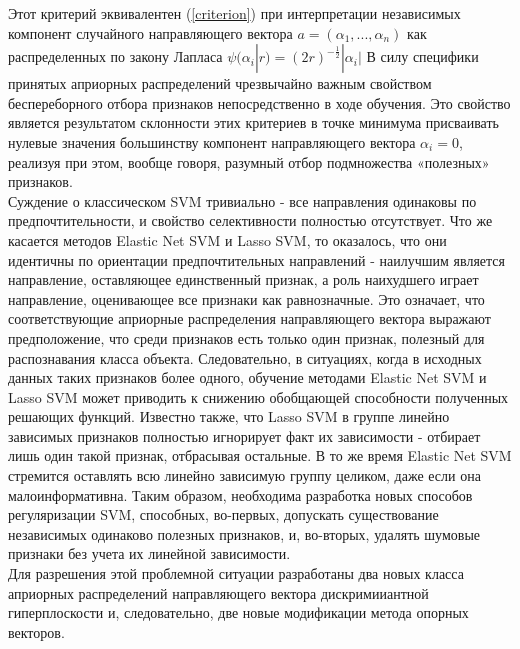 \documentclass[../body.tex]{subfiles}
\begin{document}
Этот критерий эквивалентен (\ref{criterion}) при интерпретации независимых компонент случайного
направляющего вектора $a=(\alpha_1, ..., \alpha_n)$ как распределенных по закону Лапласа $\psi(\alpha_i|r) = (2r)^{-\frac{1}{2}}|\alpha_i|$
В силу специфики принятых априорных распределений чрезвычайно важным свойством беспереборного отбора признаков непосредственно в ходе обучения. Это свойство является результатом
склонности этих критериев в точке минимума присваивать нулевые значения большинству
компонент направляющего вектора $\alpha_i = 0$, реализуя при этом, вообще говоря, разумный
отбор подмножества «полезных» признаков. 
\\

Суждение о классическом SVM тривиально - все направления одинаковы по предпочтительности, и свойство селективности полностью отсутствует. Что же касается методов
Elastic Net SVM и Lasso SVM, то оказалось, что они идентичны по ориентации предпочтительных направлений - наилучшим является направление, оставляющее единственный
признак, а роль наихудшего играет направление, оценивающее все признаки как равнозначные. Это означает, что соответствующие априорные распределения направляющего
вектора выражают предположение, что среди признаков есть только один признак, полезный для распознавания класса объекта. Следовательно, в ситуациях, когда в исходных
данных таких признаков более одного, обучение методами Elastic Net SVM и Lasso SVM
может приводить к снижению обобщающей способности полученных решающих функций.
Известно также, что Lasso SVM в группе линейно зависимых признаков полностью
игнорирует факт их зависимости - отбирает лишь один такой признак, отбрасывая остальные. В то же время Elastic Net SVM стремится оставлять всю линейно зависимую группу
целиком, даже если она малоинформативна. 
Таким образом, необходима разработка новых способов регуляризации SVM, способных, во-первых, допускать существование независимых одинаково полезных признаков, и,
во-вторых, удалять шумовые признаки без учета их линейной зависимости. 
\\

Для разрешения этой проблемной ситуации разработаны два новых
класса априорных распределений направляющего вектора дискримииантной гиперплоскости и, следовательно, две новые модификации метода опорных векторов.
\end{document}

